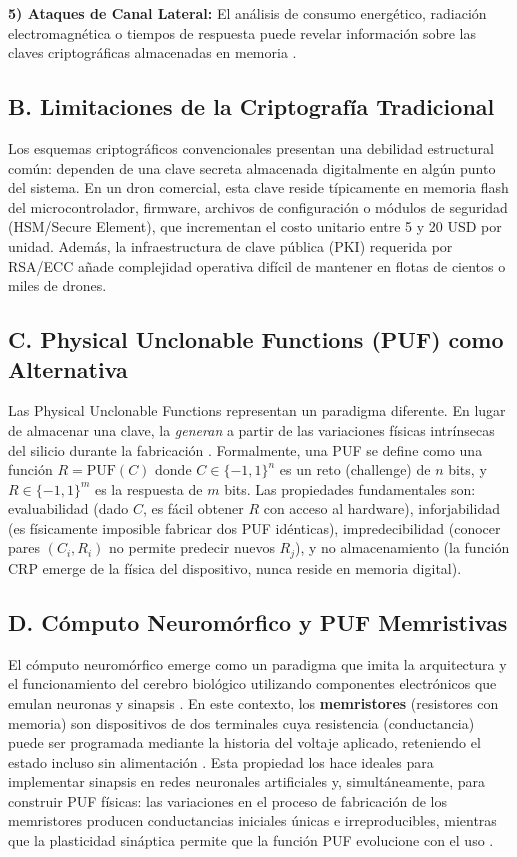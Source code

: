 \textbf{5) Ataques de Canal Lateral:} El análisis de consumo energético, radiación electromagnética o tiempos de respuesta puede revelar información sobre las claves criptográficas almacenadas en memoria \cite{gassend2002puf}.

\subsection*{B. Limitaciones de la Criptografía Tradicional}

Los esquemas criptográficos convencionales presentan una debilidad estructural común: dependen de una clave secreta almacenada digitalmente en algún punto del sistema. En un dron comercial, esta clave reside típicamente en memoria flash del microcontrolador, firmware, archivos de configuración o módulos de seguridad (HSM/Secure Element), que incrementan el costo unitario entre 5 y 20 USD por unidad. Además, la infraestructura de clave pública (PKI) requerida por RSA/ECC añade complejidad operativa difícil de mantener en flotas de cientos o miles de drones.

\subsection*{C. Physical Unclonable Functions (PUF) como Alternativa}

Las Physical Unclonable Functions representan un paradigma diferente. En lugar de almacenar una clave, la \textit{generan} a partir de las variaciones físicas intrínsecas del silicio durante la fabricación \cite{pappu2002puf}. Formalmente, una PUF se define como una función $R = \text{PUF}(C)$ donde $C \in \{-1,1\}^n$ es un reto (challenge) de $n$ bits, y $R \in \{-1,1\}^m$ es la respuesta de $m$ bits. Las propiedades fundamentales son: evaluabilidad (dado $C$, es fácil obtener $R$ con acceso al hardware), inforjabilidad (es físicamente imposible fabricar dos PUF idénticas), impredecibilidad (conocer pares $(C_i, R_i)$ no permite predecir nuevos $R_j$), y no almacenamiento (la función CRP emerge de la física del dispositivo, nunca reside en memoria digital).

\subsection*{D. Cómputo Neuromórfico y PUF Memristivas}

El cómputo neuromórfico emerge como un paradigma que imita la arquitectura y el funcionamiento del cerebro biológico utilizando componentes electrónicos que emulan neuronas y sinapsis \cite{mead1990neuromorphic}. En este contexto, los \textbf{memristores} (resistores con memoria) son dispositivos de dos terminales cuya resistencia (conductancia) puede ser programada mediante la historia del voltaje aplicado, reteniendo el estado incluso sin alimentación \cite{strukov2008memristor}. Esta propiedad los hace ideales para implementar sinapsis en redes neuronales artificiales y, simultáneamente, para construir PUF físicas: las variaciones en el proceso de fabricación de los memristores producen conductancias iniciales únicas e irreproducibles, mientras que la plasticidad sináptica permite que la función PUF evolucione con el uso \cite{rajan2020memristor}.

